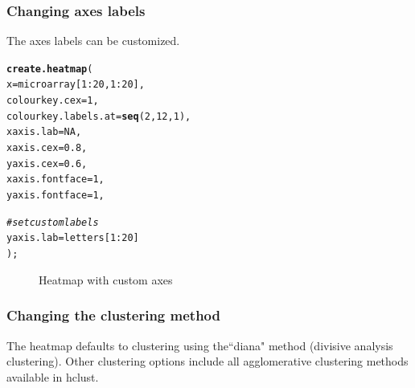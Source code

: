 \documentclass[letterpaper]{report}\usepackage[]{graphicx}\usepackage[]{color}
\makeatletter
\newcommand{\hlnum}[1]{\textcolor[rgb]{0.686,0.059,0.569}{#1}}%
\newcommand{\hlcom}[1]{\textcolor[rgb]{0.678,0.584,0.686}{\textit{#1}}}%
\newcommand{\hlopt}[1]{\textcolor[rgb]{0,0,0}{#1}}%
\newcommand{\hlstd}[1]{\textcolor[rgb]{0.345,0.345,0.345}{#1}}%
\newcommand{\hlkwc}[1]{\textcolor[rgb]{0.333,0.667,0.333}{#1}}%
\newcommand{\hlkwd}[1]{\textcolor[rgb]{0.737,0.353,0.396}{\textbf{#1}}}%
\newenvironment{kframe}{%
 \def\at@end@of@kframe{}%
 \ifinner\ifhmode%
  \def\at@end@of@kframe{\end{minipage}}%
  \begin{minipage}{\columnwidth}%
 \fi\fi%
 \def\FrameCommand##1{\hskip\@totalleftmargin \hskip-\fboxsep
 \colorbox{shadecolor}{##1}\hskip-\fboxsep
     \hskip-\linewidth \hskip-\@totalleftmargin \hskip\columnwidth}%
 \MakeFramed {\advance\hsize-\width
   \@totalleftmargin\z@ \linewidth\hsize
   \@setminipage}}%
 {\par\unskip\endMakeFramed%
 \at@end@of@kframe}
\newenvironment{knitrout}{}{} %
\makeatother
\begin{document}
\subsubsection{Changing axes labels}
The axes labels can be customized.
\begin{knitrout}
\color{fgcolor}\begin{kframe}
\begin{alltt}
\hlkwd{create.heatmap}\hlstd{(}
    \hlkwc{x} \hlstd{= microarray[}\hlnum{1}\hlopt{:}\hlnum{20}\hlstd{,} \hlnum{1}\hlopt{:}\hlnum{20}\hlstd{],}
    \hlkwc{colourkey.cex} \hlstd{=} \hlnum{1}\hlstd{,}
    \hlkwc{colourkey.labels.at} \hlstd{=} \hlkwd{seq}\hlstd{(}\hlnum{2}\hlstd{,} \hlnum{12}\hlstd{,} \hlnum{1}\hlstd{),}
    \hlkwc{xaxis.lab} \hlstd{=} \hlnum{NA}\hlstd{,}
    \hlkwc{xaxis.cex} \hlstd{=} \hlnum{0.8}\hlstd{,}
    \hlkwc{yaxis.cex} \hlstd{=} \hlnum{0.6}\hlstd{,}
    \hlkwc{xaxis.fontface} \hlstd{=} \hlnum{1}\hlstd{,}
    \hlkwc{yaxis.fontface} \hlstd{=} \hlnum{1}\hlstd{,}

    \hlcom{# set custom labels}
    \hlkwc{yaxis.lab} \hlstd{= letters[}\hlnum{1}\hlopt{:}\hlnum{20}\hlstd{]}
    \hlstd{);}
\end{alltt}
\end{kframe}\begin{figure}

{\centering {} 

}

\caption[Heatmap with custom axes]{Heatmap with custom axes}\label{fig:heatmap3}
\end{figure}


\end{knitrout}

\subsubsection{Changing the clustering method}
The heatmap defaults to clustering using the``diana" method (divisive analysis clustering). Other clustering options include all agglomerative clustering methods available in hclust.
\end{document}
